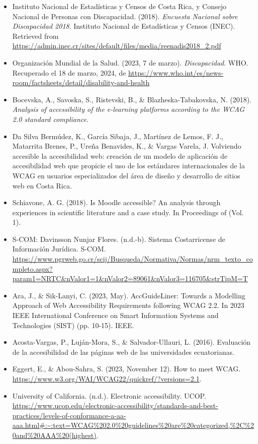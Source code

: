 \documentclass{article}
\begin{document}
\begin{itemize}
    \item Instituto Nacional de Estadísticas y Censos de Costa Rica, y Consejo Nacional de Personas con Discapacidad. (2018). \textit{Encuesta Nacional sobre Discapacidad 2018}. Instituto Nacional de Estadísticas y Censos (INEC). Retrieved from \url{https://admin.inec.cr/sites/default/files/media/reenadis2018_2.pdf}
    \item Organización Mundial de la Salud. (2023, 7 de marzo). \textit{Discapacidad}. WHO. Recuperado el 18 de marzo, 2024, de \url{https://www.who.int/es/news-room/factsheets/detail/disability-and-health}
    \item Bocevska, A., Savoska, S., Ristevski, B., \& Blazheska-Tabakovska, N. (2018). \textit{Analysis of accessibility of the e-learning platforms according to the WCAG 2.0 standard compliance}.
    \item Da Silva Bermúdez, K., García Sibaja, J., Martínez de Lemos, F. J., Matarrita Brenes, P., Ureña Benavides, K., \& Vargas Varela, J. Volviendo accesible la accesibilidad web: creación de un modelo de aplicación de accesibilidad web que propicie el uso de los estándares internacionales de la WCAG en usuarios especializados del área de diseño y desarrollo de sitios web en Costa Rica.
    \item Schiavone, A. G. (2018). Is Moodle accessible? An analysis through experiences in scientific literature and a case study. In Proceedings of (Vol. 1).
    \item S-COM: Davinsson Nunjar Flores. (n.d.-b). Sistema Costarricense de Información Jurídica. S-COM. \url{https://www.pgrweb.go.cr/scij/Busqueda/Normativa/Normas/nrm_texto_completo.aspx?param1=NRTC&nValor1=1&nValor2=89061&nValor3=116705&strTipM=T}
    \item Ara, J., \& Sik-Lanyi, C. (2023, May). AccGuideLiner: Towards a Modelling Approach of Web Accessibility Requirements following WCAG 2.2. In 2023 IEEE International Conference on Smart Information Systems and Technologies (SIST) (pp. 10-15). IEEE.
    \item Acosta-Vargas, P., Luján-Mora, S., \& Salvador-Ullauri, L. (2016). Evaluación de la accesibilidad de las páginas web de las universidades ecuatorianas.
    \item Eggert, E., \& Abou-Sahra, S. (2023, November 12). How to meet WCAG. \url{https://www.w3.org/WAI/WCAG22/quickref/?versions=2.1}.
    \item University of California. (n.d.). Electronic accessibility. UCOP. \url{https://www.ucop.edu/electronic-accessibility/standards-and-best-practices/levels-of-conformance-a-aa-aaa.html#:~:text=WCAG%202.0%20guidelines%20are%20categorized,%2C%20and%20AAA%20(highest)}.

\end{itemize}
\end{document}

